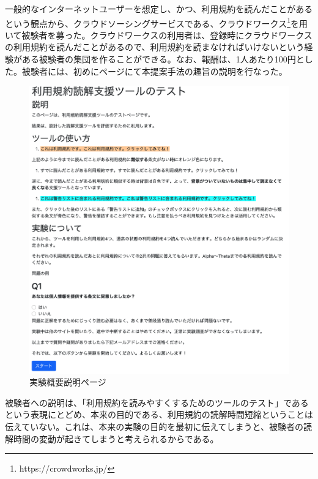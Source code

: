 一般的なインターネットユーザーを想定し、かつ、利用規約を読んだことがあるという観点から、クラウドソーシングサービスである、クラウドワークス\footnote{https://crowdworks.jp/}を用いて被験者を募った。クラウドワークスの利用者は、登録時にクラウドワークスの利用規約を読んだことがあるので、利用規約を読まなければいけないという経験がある被験者の集団を作ることができる。なお、報酬は、1人あたり100円とした。被験者には、初めにページにて本提案手法の趣旨の説明を行なった。
\begin{figure}[h]
  \begin{center}
      \includegraphics[width=16cm]{img/teststart1.png}
      \caption{実験概要説明ページ}
      \label{img:実験概要説明ページ}
  \end{center}
\end{figure}
被験者への説明は、「利用規約を読みやすくするためのツールのテスト」であるという表現にとどめ、本来の目的である、利用規約の読解時間短縮ということは伝えていない。これは、本来の実験の目的を最初に伝えてしまうと、被験者の読解時間の変動が起きてしまうと考えられるからである。

